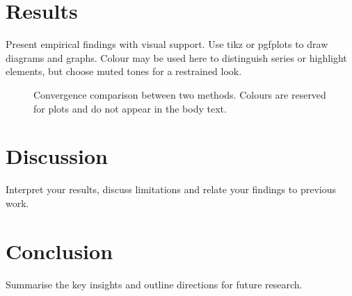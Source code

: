 \documentclass[11pt,letterpaper]{article}
\begin{document}
\section{Results}
Present empirical findings with visual support.  Use tikz or pgfplots
to draw diagrams and graphs.  Colour may be used here to distinguish
series or highlight elements, but choose muted tones for a restrained
look.

\begin{figure}[htbp]
    \centering
    \caption{Convergence comparison between two methods.  Colours are
    reserved for plots and do not appear in the body text.}
    \label{fig:convergence}
\end{figure}

\section{Discussion}
Interpret your results, discuss limitations and relate your findings to
previous work.

\section{Conclusion}
Summarise the key insights and outline directions for future research.


%

\end{document}
